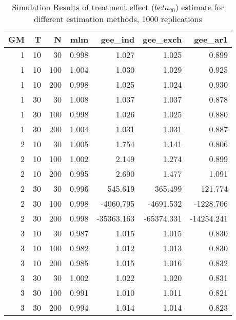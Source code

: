 \begin{table}[ht]
\centering
\begin{tabular}{rrrrrrr}
  \hline
GM & T & N & mlm & gee\_ind & gee\_exch & gee\_ar1 \\ 
  \hline
1 & 10 & 30 & 0.998 & 1.027 & 1.025 & 0.899 \\ 
  1 & 10 & 100 & 1.004 & 1.030 & 1.029 & 0.925 \\ 
  1 & 10 & 200 & 0.998 & 1.025 & 1.024 & 0.930 \\ 
  1 & 30 & 30 & 1.008 & 1.037 & 1.037 & 0.878 \\ 
  1 & 30 & 100 & 0.998 & 1.026 & 1.025 & 0.880 \\ 
  1 & 30 & 200 & 1.004 & 1.031 & 1.031 & 0.887 \\ 
   \hline
2 & 10 & 30 & 1.005 & 1.754 & 1.141 & 0.806 \\ 
  2 & 10 & 100 & 1.002 & 2.149 & 1.274 & 0.899 \\ 
  2 & 10 & 200 & 0.995 & 2.690 & 1.477 & 1.091 \\ 
  2 & 30 & 30 & 0.996 & 545.619 & 365.499 & 121.774 \\ 
  2 & 30 & 100 & 0.998 & -4060.795 & -4691.532 & -1228.706 \\ 
  2 & 30 & 200 & 0.998 & -35363.163 & -65374.331 & -14254.241 \\ 
   \hline
3 & 10 & 30 & 0.987 & 1.015 & 1.015 & 0.830 \\ 
  3 & 10 & 100 & 0.982 & 1.012 & 1.013 & 0.830 \\ 
  3 & 10 & 200 & 0.985 & 1.015 & 1.016 & 0.832 \\ 
  3 & 30 & 30 & 1.002 & 1.022 & 1.020 & 0.831 \\ 
  3 & 30 & 100 & 0.991 & 1.010 & 1.011 & 0.821 \\ 
  3 & 30 & 200 & 0.994 & 1.014 & 1.014 & 0.823 \\ 
   \hline
\end{tabular}
\caption{Simulation Results of treatment effect ($beta_{20}$) estimate for different estimation methods, 1000 replications} 
\label{tab:sim_results}
\end{table}
